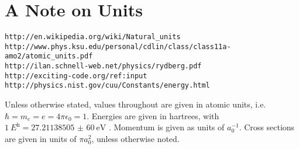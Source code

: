 \documentclass[Introduction.tex]{subfiles}
\begin{document}
\section{A Note on Units}
\label{sec:Units}

\begin{verbatim}
http://en.wikipedia.org/wiki/Natural_units
http://www.phys.ksu.edu/personal/cdlin/class/class11a-amo2/atomic_units.pdf
http://ilan.schnell-web.net/physics/rydberg.pdf
http://exciting-code.org/ref:input
http://physics.nist.gov/cuu/Constants/energy.html
\end{verbatim}

Unless otherwise stated, values throughout are given in atomic units, i.e. $\hbar = m_e = e = 4\pi\epsilon_0 = 1$. Energies are given in hartrees, with $\SI{1}{\hartree} = \SI{27.211 385 05(60)}{\electronvolt}$ \cite{Mohr2012,NISTConversions}. Momentum is given as units of $a_0^{-1}$. Cross sections are given in units of $\pi a_0^2$, unless otherwise noted.



\biblio
\end{document}
